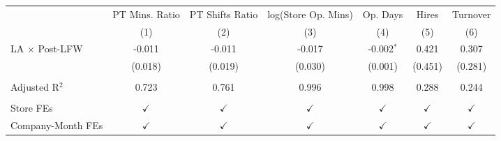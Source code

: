 
\begingroup
\centering
\scriptsize
\begin{tabular}{lcccccc}
   \toprule
                         & PT Mins. Ratio & PT Shifts Ratio & log(Store Op. Mins) & Op. Days      & Hires         & Turnover\\  
                         & (1)            & (2)             & (3)                 & (4)           & (5)           & (6)\\  
   \midrule 
   LA $\times$ Post-LFW  & -0.011         & -0.011          & -0.017              & -0.002$^{*}$  & 0.421         & 0.307\\   
                         & (0.018)        & (0.019)         & (0.030)             & (0.001)       & (0.451)       & (0.281)\\   
    \\
   Adjusted R$^2$        & 0.723          & 0.761           & 0.996               & 0.998         & 0.288         & 0.244\\  
    \\
   Store FEs             & $\checkmark$   & $\checkmark$    & $\checkmark$        & $\checkmark$  & $\checkmark$  & $\checkmark$\\   
   Company-Month FEs     & $\checkmark$   & $\checkmark$    & $\checkmark$        & $\checkmark$  & $\checkmark$  & $\checkmark$\\   
   \bottomrule
\end{tabular}
\par\endgroup


